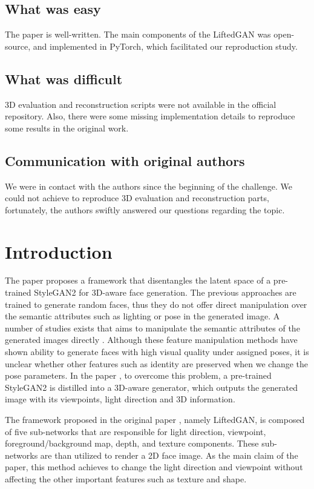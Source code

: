 \subsection*{What was easy}
The paper is well-written. The main components of the LiftedGAN was open-source, and implemented in PyTorch, which facilitated our reproduction study.

\subsection*{What was difficult}
3D evaluation and reconstruction scripts were not available in the official repository. Also, there were some missing implementation details to reproduce some results in the original work. 

\subsection*{Communication with original authors}
We were in contact with the authors since the beginning of the challenge. We could not achieve to reproduce 3D evaluation and reconstruction parts, fortunately, the authors swiftly answered our questions regarding the topic.

\section{Introduction}

The paper \cite{shi2021lifting} proposes a framework that disentangles the latent space of a pre-trained StyleGAN2 \cite{karras2020analyzing} for 3D-aware face generation. The previous approaches are trained to generate random faces, thus they do not offer direct manipulation over the semantic attributes such as lighting or pose in the generated image. A number of studies exists that aims to manipulate the semantic attributes of the generated images directly \cite{tian2018crgan, 8099624, 8578974, deng2020disentangled, nguyenphuoc2019hologan}. Although these feature manipulation methods have shown ability to generate faces with high visual quality under assigned poses, it is unclear whether other features such as identity are preserved when we change the pose parameters. In the paper \cite{shi2021lifting}, to overcome this problem, a pre-trained StyleGAN2 is distilled into a 3D-aware generator, which outputs the generated image with its viewpoints, light direction and 3D information. 

The framework proposed in the original paper \cite{shi2021lifting}, namely LiftedGAN, is composed of five sub-networks that are responsible for light direction, viewpoint, foreground/background map, depth, and texture components. These sub-networks are than utilized to render a 2D face image. As the main claim of the paper, this method achieves to change the light direction and viewpoint without affecting the other important features such as texture and shape.

